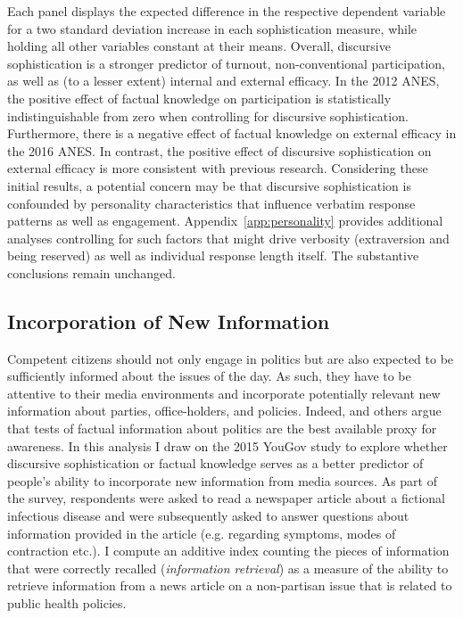 Each panel displays the expected difference in the respective dependent variable for a two standard deviation increase in each sophistication measure, while holding all other variables constant at their means. Overall, discursive sophistication is a stronger predictor of turnout, non-conventional participation, as well as (to a lesser extent) internal and external efficacy. In the 2012 ANES, the positive effect of factual knowledge on participation is statistically indistinguishable from zero when controlling for discursive sophistication. Furthermore, there is a negative effect of factual knowledge on external efficacy in the 2016 ANES. In contrast, the positive effect of discursive sophistication on external efficacy is more consistent with previous research. Considering these initial results, a potential concern may be that discursive sophistication is confounded by personality characteristics that influence verbatim response patterns as well as engagement. Appendix~\ref{app:personality} provides additional analyses controlling for such factors that might drive verbosity (extraversion and being reserved) as well as individual response length itself. The substantive conclusions remain unchanged.


\subsection*{Incorporation of New Information}
Competent citizens should not only engage in politics but are also expected to be sufficiently informed about the issues of the day. As such, they have to be attentive to their media environments and incorporate potentially relevant new information about parties, office-holders, and policies. Indeed, \citet{zaller1990political,zaller1992nature} and others argue that tests of factual information about politics are the best available proxy for awareness. In this analysis I draw on the 2015 YouGov study to explore whether discursive sophistication or factual knowledge serves as a better predictor of people's ability to incorporate new information from media sources. As part of the survey, respondents were asked to read a newspaper article about a fictional infectious disease and were subsequently asked to answer questions about information provided in the article (e.g. regarding symptoms, modes of contraction etc.). I compute an additive index counting the pieces of information that were correctly recalled (\textit{information retrieval}) as a measure of the ability to retrieve information from a news article on a non-partisan issue that is related to public health policies. 

